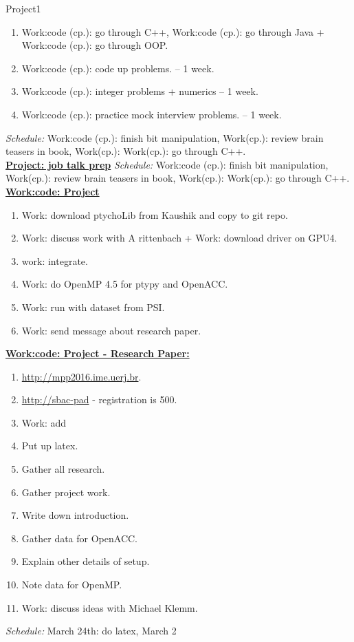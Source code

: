 \begin{columns}
\begin{column}{0.333\columnwidth}
\begin{block}{Project1}
\begin{enumerate}
\tiny \item \tiny Work:code (cp.): go through C++, Work:code (cp.): go
through Java + Work:code (cp.): go through OOP. 
\item \tiny Work:code (cp.): code up problems.  – 1 week.
\item \tiny Work:code (cp.): integer problems + numerics   -- 1 week.
\item \tiny Work:code (cp.): practice mock interview problems. – 1 week.
\end{enumerate}
{\tiny {\it {\tiny Schedule:}} Work:code (cp.): finish bit
  manipulation, Work(cp.): review brain teasers in book, Work(cp.):
  Work(cp.): go through C++.} \\
{\underline{\bf Project: job talk prep}} 
{\tiny {\it {\tiny Schedule:}} Work:code (cp.): finish bit manipulation,
Work(cp.): review brain teasers in book, Work(cp.): Work(cp.): go
through C++.} \\

{\underline{\bf Work:code: Project}}
\begin{enumerate}
\tiny \item \tiny Work: download ptychoLib from Kaushik and copy to git repo.
\item \tiny Work: discuss work with A rittenbach + Work: download driver on GPU4.
\item \tiny work: integrate.
\item \tiny Work: do OpenMP 4.5 for ptypy and OpenACC.
\item \tiny Work: run with dataset from PSI.
\item \tiny Work: send message about research paper. 
\end{enumerate}

{\underline{\bf Work:code: Project - Research Paper:}}
\begin{enumerate}
\tiny \item \tiny \url{http://mpp2016.ime.uerj.br}. 
\item \tiny \url{http://sbac-pad}  - registration is  500.

\item \tiny Work: add 
\item \tiny Put up latex.  
\item \tiny Gather all research. 
\item \tiny Gather project work. 
\item \tiny Write down introduction.
\item \tiny Gather data for OpenACC. 
\item \tiny Explain other details of setup. 
\item \tiny Note data for OpenMP. 
\item \tiny Work: discuss ideas with Michael Klemm. 
\end{enumerate}
{\tiny {\textit{Schedule:} March 24th: do latex, March 2}}\\


\end{block}
\end{column}
\end{columns}
